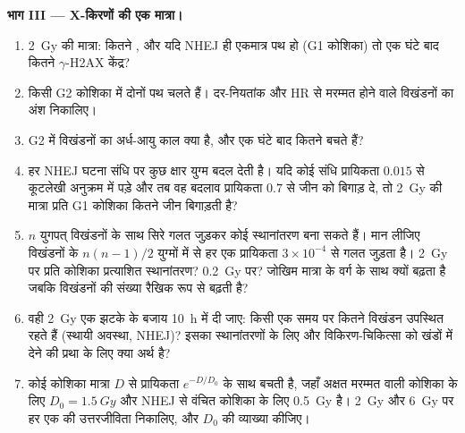 \begin{problem}
\medskip
\noindent\textbf{भाग III --- X-किरणों की एक मात्रा।}
\begin{enumerate}[resume]
  \item \qty{2}{Gy} की मात्रा: कितने , और यदि NHEJ ही
        एकमात्र पथ हो (G1 कोशिका) तो एक घंटे बाद कितने
        $\gamma$-H2AX केंद्र?
  \item किसी G2 कोशिका में दोनों पथ चलते हैं। दर-नियतांक और HR से
        मरम्मत होने वाले विखंडनों का अंश निकालिए।
  \item G2 में विखंडनों का अर्ध-आयु काल क्या है, और एक घंटे बाद कितने
        बचते हैं?
  \item हर NHEJ घटना संधि पर कुछ क्षार युग्म बदल देती है। यदि कोई
        संधि प्रायिकता $0.015$ से कूटलेखी अनुक्रम में पड़े और तब वह
        बदलाव प्रायिकता $0.7$ से जीन को बिगाड़ दे, तो \qty{2}{Gy} की
        मात्रा प्रति G1 कोशिका कितने जीन बिगाड़ती है?
  \item $n$ युगपत् विखंडनों के साथ सिरे गलत जुड़कर कोई स्थानांतरण बना
        सकते हैं। मान लीजिए विखंडनों के $n(n-1)/2$ युग्मों में से हर
        एक प्रायिकता $3\times 10^{-4}$ से गलत जुड़ता है। \qty{2}{Gy}
        पर प्रति कोशिका प्रत्याशित स्थानांतरण? \qty{0.2}{Gy} पर? जोखिम
        मात्रा के वर्ग के साथ क्यों बढ़ता है जबकि विखंडनों की संख्या
        रैखिक रूप से बढ़ती है?
  \item वही \qty{2}{Gy} एक झटके के बजाय \qty{10}{h} में दी जाए: किसी
        एक समय पर कितने विखंडन उपस्थित रहते हैं (स्थायी अवस्था, NHEJ)?
        इसका स्थानांतरणों के लिए और विकिरण-चिकित्सा को खंडों में देने
        की प्रथा के लिए क्या अर्थ है?
  \item कोई कोशिका मात्रा $D$ से प्रायिकता $e^{-D/D_{0}}$ के साथ बचती
        है, जहाँ अक्षत मरम्मत वाली कोशिका के लिए
        $D_{0} = \qty{1.5}{Gy}$ और NHEJ से वंचित कोशिका के लिए
        \qty{0.5}{Gy} है। \qty{2}{Gy} और \qty{6}{Gy} पर हर एक की
        उत्तरजीविता निकालिए, और $D_{0}$ की व्याख्या कीजिए।
\end{enumerate}


\end{problem}
